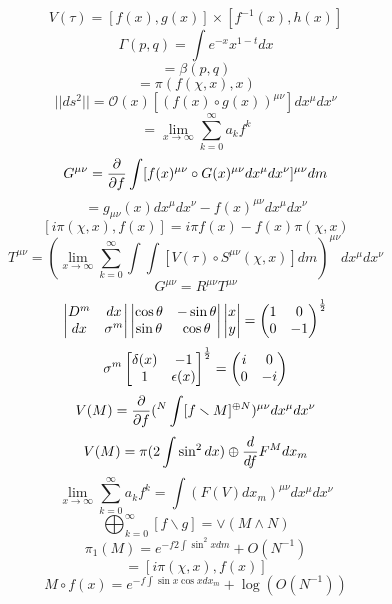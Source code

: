 \documentclass{jsarticle}
\begin{document}
$$ V(\tau) = [f(x),g(x)] \times [f^{-1}(x), h(x)] $$
$$ \Gamma(p,q) = \int e^{-x} x^{1 - t}dx $$
$$ = \beta(p,q) $$
$$ = \pi (f(\chi,x),x) $$
$$ ||ds^2|| = \mathcal{O}(x)[(f(x) \circ g(x))^{\mu\nu}]dx^{\mu}dx^{\nu} $$
$$ = \lim_{x \to \infty} \sum_{k=0}^{\infty}a_k f^k $$
$$ G^{\mu\nu} = {\partial \over \partial f}\int [f(x)^{\mu\nu} \circ G(x)^{\mu\nu}dx^{\mu}dx^{\nu}]^{\mu\nu}dm $$
$$ = g_{\mu\nu}(x)dx^{\mu}dx^{\nu} - f(x)^{\mu\nu}dx^{\mu}dx^{\nu} $$
$$ [i \pi(\chi,x),f(x)] = i \pi f(x) - f(x) \pi(\chi,x) $$
$$ T^{\mu\nu} = (\lim_{x \to \infty} \sum_{k=0}^{\infty}\int \int [V(\tau) \circ S^{\mu\nu}(\chi,x)]dm)
^{\mu\nu}dx^{\mu}dx^{\nu} $$
$$ G^{\mu\nu} = R^{\mu\nu}T^{\mu\nu} $$
$$ \begin{vmatrix} D^m & dx \\
dx & \sigma^m \end{vmatrix} \begin{vmatrix} \cos \theta & - \sin \theta \\
\sin \theta & \cos \theta \end{vmatrix} \begin{vmatrix} x \\
y \end{vmatrix} = \begin{pmatrix} 1 & 0 \\ 
0 & - 1 \end{pmatrix}^{1 \over 2} $$
$$ \sigma^m \begin{bmatrix} \delta(x) & - 1 \\
1 & \epsilon(x) \end{bmatrix}^{1 \over 2} = \begin{pmatrix} i & 0 \\
0 & - i \end{pmatrix} $$
$$ V(M) = {\partial \over \partial f} ({}^N \int [f \smallsetminus M]^{\oplus N})^{\mu\nu} dx^{\mu}dx^{\nu} $$
$$ V(M) = \pi(2 \int \sin^2 dx)\oplus {d \over df}F^M dx_m $$
$$ \lim_{x \to \infty}\sum_{k=0}^{\infty} a_k f^k = \int (F(V)dx_m)^{\mu\nu}dx^{\mu}dx^{\nu} $$
$$ \bigoplus_{k=0}^{\infty}[ f \smallsetminus g] = \vee(M \wedge N) $$
$$ \pi_1 (M) = e^{-f 2 \int \sin^2 x dm} + O(N^{-1}) $$
$$ = [i \pi(\chi,x),f(x)] $$
$$ M \circ f(x) = e^{-f \int \sin x \cos x dx_m} + \log (O(N^{-1})) $$
\end{document}
